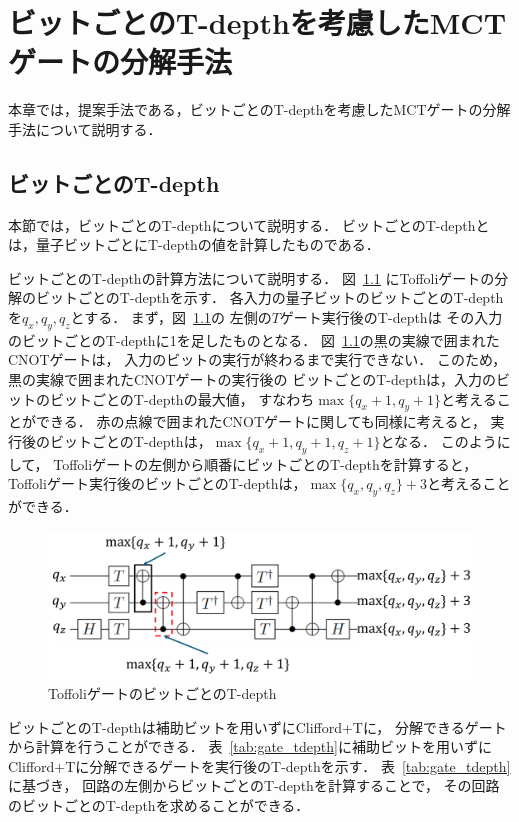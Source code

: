 \chapter{ビットごとのT-depthを考慮したMCTゲートの分解手法}
本章では，提案手法である，ビットごとのT-depthを考慮したMCTゲートの分解手法について説明する．
\section{ビットごとのT-depth}
本節では，ビットごとのT-depthについて説明する．
ビットごとのT-depthとは，量子ビットごとにT-depthの値を計算したものである．
\par
ビットごとのT-depthの計算方法について説明する．
図~\ref{toffoli_bit}
にToffoliゲートの分解のビットごとのT-depthを示す．
各入力の量子ビットのビットごとのT-depthを$q_{x}, q_{y}, q_{z}$とする．
まず，図~\ref{toffoli_bit}の
左側の$T$ゲート実行後のT-depthは
その入力のビットごとのT-depthに1を足したものとなる．
図~\ref{toffoli_bit}の黒の実線で囲まれたCNOTゲートは，
入力のビットの実行が終わるまで実行できない．
このため，
黒の実線で囲まれたCNOTゲートの実行後の
ビットごとのT-depthは，入力のビットのビットごとのT-depthの最大値，
すなわち$\max\{q_{x}+1, q_{y}+1\}$と考えることができる．
赤の点線で囲まれたCNOTゲートに関しても同様に考えると，
実行後のビットごとのT-depthは，$\max\{q_{x}+1, q_{y}+1, q_{z}+1\}$となる．
このようにして，
Toffoliゲートの左側から順番にビットごとのT-depthを計算すると，
Toffoliゲート実行後のビットごとのT-depthは，$\max\{q_{x},q_{y},q_{z}\}+3$と考えることができる．
\begin{figure}
  \centering
  \includegraphics[width=12cm]{img/toffoli_bit.pdf}
  \caption{ToffoliゲートのビットごとのT-depth}
  \label{toffoli_bit}
\end{figure}
\par
ビットごとのT-depthは補助ビットを用いずにClifford+Tに，
分解できるゲートから計算を行うことができる．
表~\ref{tab:gate_tdepth}に補助ビットを用いずに
Clifford+Tに分解できるゲートを実行後のT-depthを示す．
表~\ref{tab:gate_tdepth}に基づき，
回路の左側からビットごとのT-depthを計算することで，
その回路のビットごとのT-depthを求めることができる．
